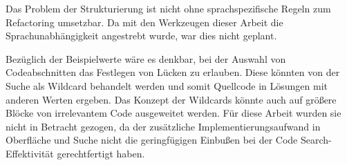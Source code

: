 Das Problem der Strukturierung ist nicht ohne sprachspezifische Regeln zum Refactoring umsetzbar.
Da mit den Werkzeugen dieser Arbeit die Sprachunabhängigkeit angestrebt wurde, war dies nicht geplant.

Bezüglich der Beispielwerte wäre es denkbar, bei der Auswahl von Codeabschnitten das Festlegen von Lücken zu erlauben.
Diese könnten von der Suche als Wildcard behandelt werden und somit Quellcode in Lösungen mit anderen Werten ergeben.
Das Konzept der Wildcards könnte auch auf größere Blöcke von irrelevantem Code ausgeweitet werden.
Für diese Arbeit wurden sie nicht in Betracht gezogen, da der zusätzliche Implementierungsaufwand in Oberfläche und Suche nicht die geringfügigen Einbußen bei der Code Search-Effektivität gerechtfertigt haben.

